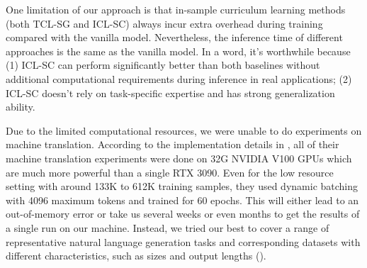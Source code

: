 One limitation of our approach is that in-sample curriculum learning methods (both TCL-SG and ICL-SC) always incur extra overhead during training compared with the vanilla model. Nevertheless, the inference time of different approaches is the same as the vanilla model.
In a word, it's worthwhile because (1) ICL-SC can perform significantly better than both baselines without additional computational requirements during inference in real applications; (2) ICL-SC doesn't rely on task-specific expertise and has strong generalization ability.

Due to the limited computational resources, we were unable to do experiments on machine translation.
According to the implementation details in \citet{liang-etal-2021-token-wise}, all of their machine translation experiments were done on 32G NVIDIA V100 GPUs which are much more powerful than a single RTX 3090.
Even for the low resource setting with around 133K to 612K training samples, they used dynamic batching with 4096 maximum tokens and trained for 60 epochs.
This will either lead to an out-of-memory error or take us several weeks or even months to get the results of a single run on our machine.
Instead, we tried our best to cover a range of representative natural language generation tasks and corresponding datasets with different characteristics, such as sizes and output lengths ().